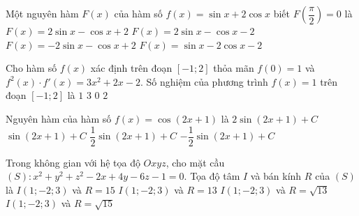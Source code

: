 \begin{ex}%
Một nguyên hàm $F(x)$ của hàm số $f(x)=\sin x+2\cos x$ biết $F\left( \dfrac{\pi}{2}\right)=0$ là
\choice
	{ $F(x)=2\sin x-\cos x+2 $}
	{\True $F(x)=2\sin x-\cos x-2  $}
	{$F(x)=-2\sin x-\cos x+2  $}
	{ $F(x)=\sin x-2\cos x-2  $}
\end{ex}

\begin{ex}%
Cho hàm số $f(x)$ xác định trên đoạn $[-1;2]$ thỏa mãn $f(0)=1$ và $f^2(x)\cdot f'(x)=3x^2+2x-2$. Số nghiệm của phương trình $f(x)=1$ trên đoạn $[-1;2]$ là
\choice
	{ $1 $}
	{$3 $}
	{$ 0$}
	{\True $2 $}
\end{ex}
\begin{ex}%
Nguyên hàm của hàm số $f(x)=\cos (2x +1)$ là
\choice
	{ $2 \sin (2x+1)+C $}
	{$\sin(2x+1)+C $}
	{\True $\dfrac{1}{2} \sin (2x+1)+C $}
	{ $-\dfrac{1}{2} \sin (2x+1)+C $}
\end{ex}
\begin{ex}%
Trong không gian với hệ tọa độ $Oxyz$, cho mặt cầu $(S): x^2+y^2+z^2-2x+4y-6z-1=0$. Tọa độ tâm $I$ và bán kính $R$ của $(S)$ là
\choice
	{ $I(1;-2;3)$ và $R=15$}
	{$I(1;-2;3)$ và $R=13 $}
	{$I(1;-2;3)$ và $R=\sqrt{13} $}
	{\True $I(1;-2;3)$ và $R=\sqrt{15} $}
\end{ex}
